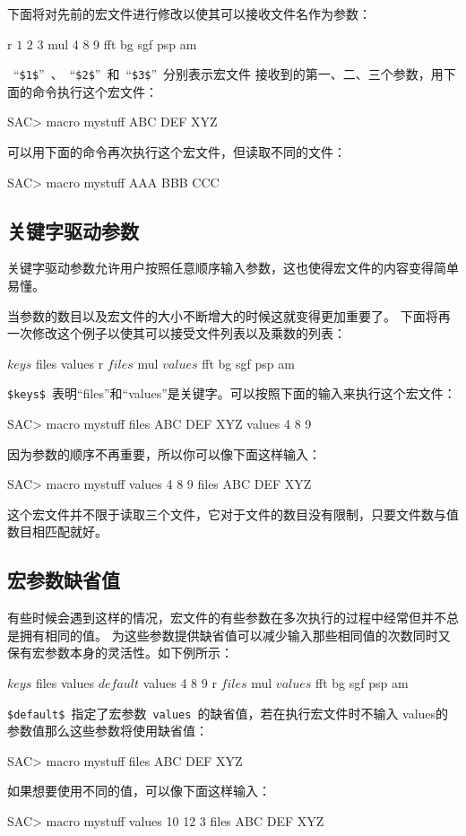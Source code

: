 下面将对先前的宏文件进行修改以使其可以接收文件名作为参数：
\begin{SACCode}
r $1$ $2$ $3$
mul 4 8 9
fft
bg sgf
psp am
\end{SACCode}
~``\verb+$1$+''~、~``\verb+$2$+''~和~``\verb+$3$+''~分别表示宏文件
接收到的第一、二、三个参数，用下面的命令执行这个宏文件：
\begin{SACCode}
SAC> macro mystuff ABC DEF XYZ
\end{SACCode}

可以用下面的命令再次执行这个宏文件，但读取不同的文件：
\begin{SACCode}
SAC> macro mystuff AAA BBB CCC
\end{SACCode}

\subsection{关键字驱动参数}
关键字驱动参数允许用户按照任意顺序输入参数，这也使得宏文件的内容变得简单易懂。

当参数的数目以及宏文件的大小不断增大的时候这就变得更加重要了。
下面将再一次修改这个例子以使其可以接受文件列表以及乘数的列表：
\begin{SACCode}
$keys$ files values
r $files$
mul $values$
fft
bg sgf
psp am
\end{SACCode}
\verb+$keys$+~表明``files''和``values''是关键字。可以按照下面的输入来执行这个宏文件：
\begin{SACCode}
SAC> macro mystuff files ABC DEF XYZ values 4 8 9
\end{SACCode}
因为参数的顺序不再重要，所以你可以像下面这样输入：
\begin{SACCode}
SAC> macro mystuff values 4 8 9 files ABC DEF XYZ
\end{SACCode}
这个宏文件并不限于读取三个文件，它对于文件的数目没有限制，只要文件数与值数目相匹配就好。

\subsection{宏参数缺省值}
有些时候会遇到这样的情况，宏文件的有些参数在多次执行的过程中经常但并不总是拥有相同的值。
为这些参数提供缺省值可以减少输入那些相同值的次数同时又保有宏参数本身的灵活性。如下例所示：
\begin{SACCode}
$keys$ files values
$default$ values 4 8 9
r $files$
mul $values$
fft
bg sgf
psp am
\end{SACCode}
\verb+$default$+~指定了宏参数~\verb+values+~的缺省值，若在执行宏文件时不输入
values的参数值那么这些参数将使用缺省值：
\begin{SACCode}
SAC> macro mystuff files ABC DEF XYZ
\end{SACCode}
如果想要使用不同的值，可以像下面这样输入：
\begin{SACCode}
SAC> macro mystuff values 10 12 3 files ABC DEF XYZ
\end{SACCode}

